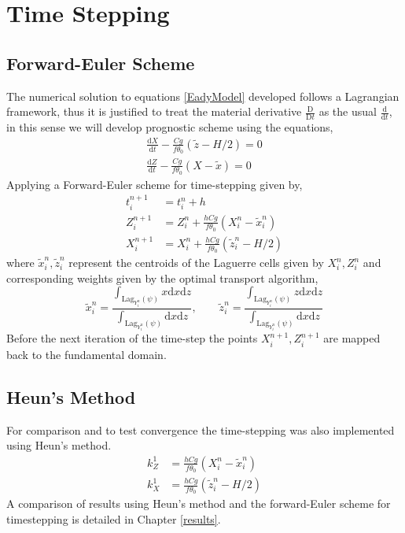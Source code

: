 \section{Time Stepping \label{timestep}}
\subsection{Forward-Euler Scheme}
The numerical solution to equations \ref{EadyModel} developed follows a Lagrangian framework, thus it is justified to treat the material derivative $\frac{\mathrm{D } }{\mathrm{D} t}$ as the usual $\frac{\mathrm{d }}{\mathrm{d} t}$, in this sense we will develop prognostic scheme using the equations,
	\begin{equation*}
	\begin{aligned}
	\frac{\mathrm{d}X}{\mathrm{d}t} -\frac{Cg}{f\theta _0}\left(\tilde{z}-H/2\right) = 0 \\
	\frac{\mathrm{d}Z}{\mathrm{d}t} - \frac{Cg}{f\theta_0}\left(X - \tilde{x}\right) = 0
	\end{aligned}
	\end{equation*}
Applying a Forward-Euler scheme for time-stepping given by,
\begin{equation}
	\begin{aligned}
	t_i^{n+1} &= t_i^n + h\\
	Z_i^{n+1} &= Z_i^n + \frac{hCg}{f\theta_0}\left(X_i^n-\tilde{x}_i^n\right)\\
	X_i^{n+1} &= X_i^n + \frac{hCg}{f\theta_0}\left(\tilde{z}_i^n-H/2\right)
	\end{aligned}
\end{equation}
where $\tilde{x}_i^n,\tilde{z}_i^n$ represent the centroids of the Laguerre cells given by $X_i^n,Z_i^n$ and corresponding weights given by the optimal transport algorithm,
\begin{equation}
	\tilde{x}_i^n = \frac{\int_{\mathrm{Lag}_{Y_i^n}(\psi)} x \mathrm{d}x \mathrm{d}z}{\int_{\mathrm{Lag}_{Y_i^n}(\psi)} \mathrm{d}x \mathrm{d}z}, \qquad
	\tilde{z}_i^n = \frac{\int_{\mathrm{Lag}_{Y_i^n}(\psi)} z \mathrm{d}x \mathrm{d}z}{\int_{\mathrm{Lag}_{Y_i^n}(\psi)} \mathrm{d}x \mathrm{d}z}
\end{equation}
Before the next iteration of the time-step the points $X_i^{n+1}, Z_i^{n+1}$ are mapped back to the fundamental domain.
\subsection{Heun's Method}
For comparison and to test convergence the time-stepping was also implemented using Heun's method.
\begin{equation}
	\begin{aligned}
	k^1_Z &= \frac{hCg}{f\theta_0}\left(X_i^n-\tilde{x}_i^n\right)\\
	k^1_X &= \frac{hCg}{f\theta_0}\left(\tilde{z}_i^n-H/2\right)
	\end{aligned}
\end{equation}
A comparison of results using Heun's method and the forward-Euler scheme for timestepping is detailed in Chapter \ref{results}.
